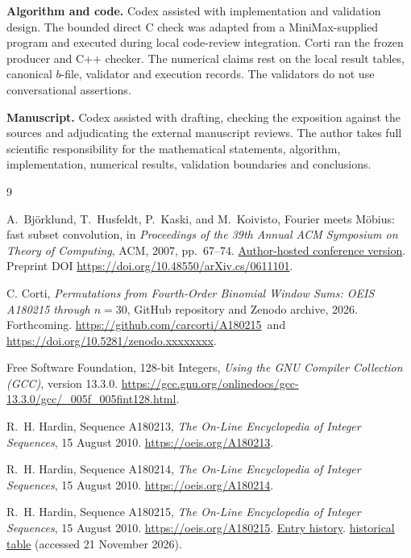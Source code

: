 \documentclass[11pt]{article}
\begin{document}
\smallskip
\noindent\textbf{Algorithm and code.}
Codex assisted with implementation and validation design.
The bounded direct C check was adapted from a MiniMax-supplied program
and executed during local code-review integration. Corti ran the frozen
producer and C++ checker.
The numerical claims rest on the local result tables, canonical
\(b\)-file, validator and execution records. The validators do not use
conversational assertions.

\smallskip
\noindent\textbf{Manuscript.}
Codex assisted with drafting, checking the exposition against the sources
and adjudicating the external manuscript reviews. The author takes full scientific
responsibility for the mathematical statements, algorithm, implementation,
numerical results, validation boundaries and conclusions.

\clearpage
\begin{thebibliography}{9}
\sloppy\raggedright
{}
A.~Bj\"orklund, T.~Husfeldt, P.~Kaski, and M.~Koivisto,
Fourier meets M\"obius: fast subset convolution,
in \emph{Proceedings of the 39th Annual ACM Symposium on Theory of Computing},
ACM, 2007, pp.~67--74.
\href{https://www.cs.helsinki.fi/u/mkhkoivi/publications/stoc-2007.pdf}{Author-hosted conference version}.
Preprint DOI \url{https://doi.org/10.48550/arXiv.cs/0611101}.

C. Corti, \emph{Permutations from Fourth-Order Binomial Window Sums:
OEIS A180215 through \(n=30\)}, GitHub repository and Zenodo archive, 2026.
Forthcoming.
\url{https://github.com/carcorti/A180215}\ and
\url{https://doi.org/10.5281/zenodo.xxxxxxxx}.

Free Software Foundation, 128-bit Integers,
\emph{Using the GNU Compiler Collection (GCC)}, version 13.3.0.
\url{https://gcc.gnu.org/onlinedocs/gcc-13.3.0/gcc/_005f_005fint128.html}.

R.~H. Hardin, Sequence A180213, \emph{The On-Line Encyclopedia of
Integer Sequences}, 15 August 2010.
\url{https://oeis.org/A180213}.

R.~H. Hardin, Sequence A180214, \emph{The On-Line Encyclopedia of
Integer Sequences}, 15 August 2010.
\url{https://oeis.org/A180214}.

R.~H. Hardin, Sequence A180215, \emph{The On-Line Encyclopedia of
Integer Sequences}, 15 August 2010.
\url{https://oeis.org/A180215}.
\href{https://oeis.org/history?seq=A180215}{Entry history}.
\href{https://oeis.org/A180215/b180215.txt}{historical table}
(accessed 21 November 2026).
\end{thebibliography}
\end{document}
